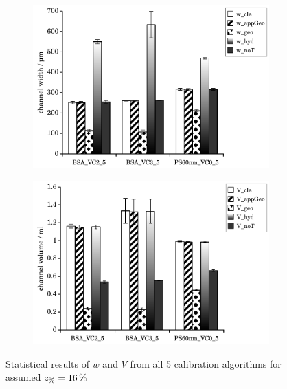 \begin{figure}[!hb]
  \begin{center}
    \begin{subfigure}{\subFigSize}
      \includegraphics[width=\linewidth]{./images/data/eval_own_p12/ownData_w_p12.pdf}
    \end{subfigure}
    \begin{subfigure}{\subFigSize}
      \includegraphics[width=\linewidth]{./images/data/eval_own_p12/ownData_V_p12.pdf}
    \end{subfigure}
  \end{center}
  \vspace*{-4ex}    
  \caption[Statistical results of $w$ and $V$ from all 5 calibration algorithms for assumed $\zP = \SI{16}{\percent}$]{
    Statistical results of $w$ and $V$ from all 5 calibration algorithms for assumed $\zP = \SI{16}{\percent}$
  }
\label{fig:statCalibResP16}
\end{figure}
